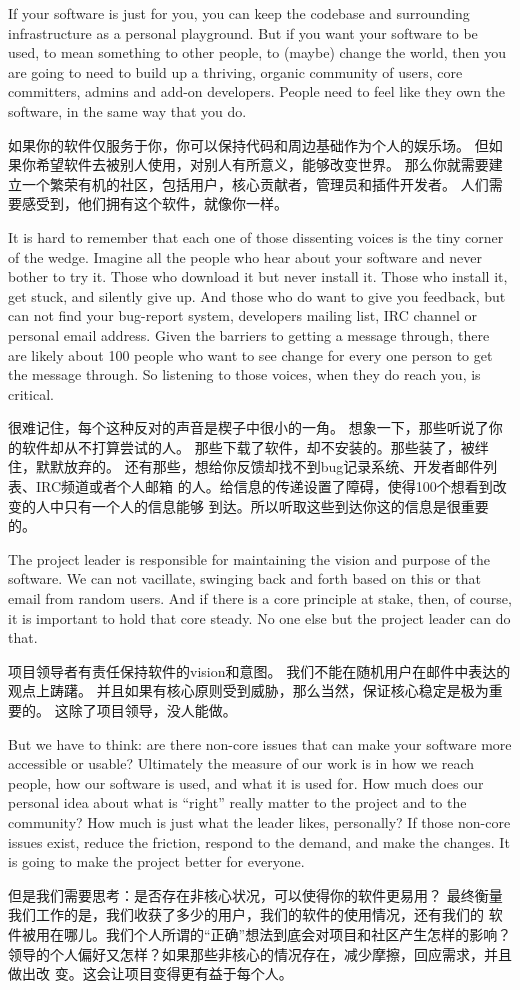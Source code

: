If your software is just for you, you can keep the codebase and surrounding
infrastructure as a personal playground. But if you want your software to be
used, to mean something to other people, to (maybe) change the world, then
you are going to need to build up a thriving, organic community of users, core
committers, admins and add-on developers. People need to feel like they own the
software, in the same way that you do.

如果你的软件仅服务于你，你可以保持代码和周边基础作为个人的娱乐场。
但如果你希望软件去被别人使用，对别人有所意义，能够改变世界。
那么你就需要建立一个繁荣有机的社区，包括用户，核心贡献者，管理员和插件开发者。
人们需要感受到，他们拥有这个软件，就像你一样。

It is hard to remember that each one of those dissenting voices is the tiny
corner of the wedge. Imagine all the people who hear about your software and
never bother to try it. Those who download it but never install it. Those who
install it, get stuck, and silently give up. And those who do want to give you
feedback, but can not find your bug-report system, developers mailing list, IRC
channel or personal email address. Given the barriers to getting a message
through, there are likely about 100 people who want to see change for
every one person to get the message through. So listening to those voices, when
they do reach you, is critical.

很难记住，每个这种反对的声音是楔子中很小的一角。
想象一下，那些听说了你的软件却从不打算尝试的人。
那些下载了软件，却不安装的。那些装了，被绊住，默默放弃的。
还有那些，想给你反馈却找不到bug记录系统、开发者邮件列表、IRC频道或者个人邮箱
的人。给信息的传递设置了障碍，使得100个想看到改变的人中只有一个人的信息能够
到达。所以听取这些到达你这的信息是很重要的。

The project leader is responsible for maintaining the vision and purpose of the
software. We can not vacillate, swinging back and forth based on this or that
email from random users. And if there is a core principle at stake, then, of
course, it is important to hold that core steady. No one else but the project
leader can do that.

项目领导者有责任保持软件的vision和意图。
我们不能在随机用户在邮件中表达的观点上踌躇。
并且如果有核心原则受到威胁，那么当然，保证核心稳定是极为重要的。
这除了项目领导，没人能做。

But we have to think: are there non-core issues that can make your software more
accessible or usable? Ultimately the measure of our work is in how we reach people, how our software is used, and what it is used for. How much does our personal idea about what is ``right'' really matter to the project and to the community? How much is just what the leader likes, personally? If those non-core issues exist, reduce the friction, respond to the demand, and make the changes. It is going to make the project better for everyone.

但是我们需要思考：是否存在非核心状况，可以使得你的软件更易用？
最终衡量我们工作的是，我们收获了多少的用户，我们的软件的使用情况，还有我们的
软件被用在哪儿。我们个人所谓的``正确''想法到底会对项目和社区产生怎样的影响？
领导的个人偏好又怎样？如果那些非核心的情况存在，减少摩擦，回应需求，并且做出改
变。这会让项目变得更有益于每个人。